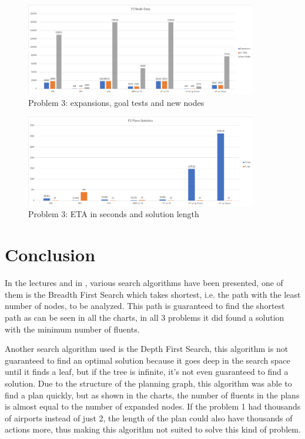 \begin{figure}[ht]
	\centering
	\includegraphics[width=0.9\textwidth]{images/P3_node_data.png}
	\caption{Problem 3: expansions, goal tests and new nodes}
	\label{fig:p3_node_data}
\end{figure}

\begin{figure}[ht]
	\centering
	\includegraphics[width=0.9\textwidth]{images/P3_plan_statistics.png}
	\caption{Problem 3: ETA in seconds and solution length}
	\label{fig:p3_plan_statistics}
\end{figure}


\section{Conclusion}\label{sec:conclusion}

In the lectures and in \cite{aima}, various search algorithms have been presented, one of them is the Breadth First Search which takes shortest, i.e. the path with the least number of nodes, to be analyzed. This path is guaranteed to find the shortest path as can be seen in all the charts, in all 3 problems it did found a solution with the minimum number of fluents.

Another search algorithm used is the Depth First Search, this algorithm is not guaranteed to find an optimal solution because it goes deep in the search space until it finds a leaf, but if the tree is infinite, it’s not even guaranteed to find a solution. Due to the structure of the planning graph, this algorithm was able to find a plan quickly, but as shown in the charts, the number of fluents in the plans is almost equal to the number of expanded nodes. If the problem 1 had thousands of airports instead of just 2, the length of the plan could also have thousands of actions more, thus making this algorithm not suited to solve this kind of problem. 

